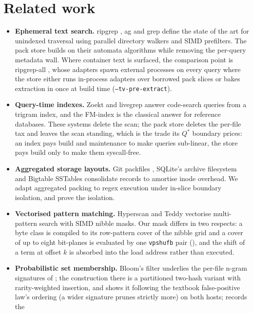 \documentclass[11pt,letterpaper]{article}
\begin{document}
\section{Related work}
\begin{itemize}[leftmargin=*,itemsep=1pt]
\item \textbf{Ephemeral text search.} ripgrep \cite{ripgrep}, ag and grep
define the state of the art for unindexed traversal using parallel directory
walkers and SIMD prefilters. The pack store builds on their automata
algorithms while removing the per-query metadata wall. Where container text
is surfaced, the comparison point is ripgrep-all \cite{ripgrepall}, whose
adapters spawn external processes on every query where the store either runs
in-process adapters over borrowed pack slices or bakes extraction in once at
build time (\texttt{--tv-pre-extract}).
\item \textbf{Query-time indexes.} Zoekt \cite{zoekt} and livegrep
\cite{livegrep} answer code-search queries from a trigram index, and the
FM-index \cite{ferragina2000} is the classical answer for reference
databases. These systems delete the scan; the pack store deletes the
per-file tax and leaves the scan standing, which is the trade its
$Q^{*}$ boundary prices: an index pays build and maintenance to make
queries sub-linear, the store pays build only to make them
syscall-free.
\item \textbf{Aggregated storage layouts.} Git packfiles \cite{gitpack},
SQLite's archive filesystem \cite{sqlar} and Bigtable SSTables consolidate
records to amortise inode overhead. We adapt aggregated packing to regex
execution under in-slice boundary isolation, and prove the isolation.
\item \textbf{Vectorised pattern matching.} Hyperscan \cite{hyperscan} and
Teddy \cite{qiu2021teddy} vectorise multi-pattern search with SIMD nibble
masks. Our mask differs in two respects: a byte class is compiled to its
row-pattern cover of the nibble grid and a cover of up to eight bit-planes
is evaluated by one \texttt{vpshufb} pair (), and the shift
of a term at offset $k$ is absorbed into the load address rather than
executed.
\item \textbf{Probabilistic set membership.} Bloom's filter
\cite{bloom1970} underlies the per-file n-gram signatures of
; the construction there is a partitioned two-hash variant
with rarity-weighted insertion, and  shows it following
the textbook false-positive law's ordering (a wider signature prunes
strictly more) on both hosts;  records the

\end{itemize}
\end{document}
